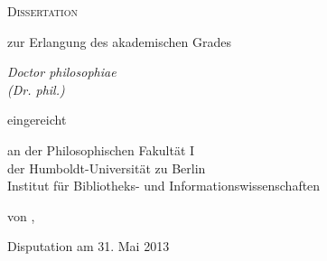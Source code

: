 
\renewcommand{\thepage}{\roman{page}}

\makeatletter

\begin{titlepage}

\begin{center}
\vfill

{\bfseries
  {\huge\strut\ignorespaces\@title\par}
  {\large\strut\ignorespaces\@subtitle\par}
}\vfill

{\huge\textsc{Dissertation}}\par
{\large zur Erlangung des akademischen Grades\par
{}\baselineskip  
{\it Doctor philosophiae\\(Dr. phil.)} \par
{}\baselineskip
eingereicht\par
{}\baselineskip
an der Philosophischen Fakult\"at I\\
der Humboldt-Universität zu Berlin\\
Institut f\"ur Bibliotheks- und Informationswissenschaften\par
{}\baselineskip
von \@author,\par
\baselineskip
Disputation am 31. Mai 2013
}
\end{center}

\pagebreak

\thispagestyle{empty}
  \setlength{\parindent}{0pt}
  \setlength{\parskip}{10mm}
  \@uppertitleback

\end{titlepage}

\makeatother
